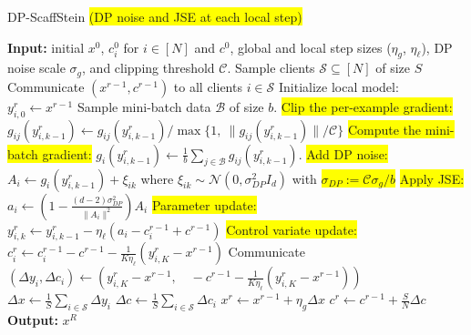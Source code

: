 \begin{algorithm}[H]
\caption{DP-ScaffStein \colorbox{yellow}{(DP noise and JSE at {\color{red}each} local step)}}
\label{algo:scaffstein_2}
\begin{algorithmic}[1]
\State \textbf{Input:} initial $x^0$, $c_i^0$ for $i \in [N]$ and $c^0$, global and local step sizes ($\eta_g$, $\eta_\ell$), DP noise scale $\sigma_g$, and clipping threshold $\mathcal{C}$.
\State Sample clients $\mathcal{S} \subseteq [N]$ of size $S$
\State Communicate $(x^{r-1}, c^{r-1})$ to all clients $i \in \mathcal{S}$
\State Initialize local model: $y_{i,0}^{r} \gets x^{r-1}$
\State Sample mini-batch data $\mathcal{B}$ of size $b$.
\State \colorbox{yellow}{Clip the per-example gradient:}
\State $g_{ij}(y^r_{i,k-1}) \gets g_{ij}(y^r_{i,k-1}) / \max \{1, \ \|g_{ij}(y^r_{i,k-1})\|/\mathcal{C}\} $
\EndFor
\State \colorbox{yellow}{Compute the mini-batch gradient:}
$g_{i}(y_{i,k-1}^{r}) \gets \frac{1}{b} \sum_{j \in \mathcal{B}} g_{ij}(y_{i,k-1}^{r})$. 
\State \colorbox{yellow}{Add DP noise:}  $A_i \gets g_i(y_{i,k-1}^{r}) +  \xi_{ik}$ where $\xi_{ik} \sim \mathcal{N}(0,  \sigma_{DP}^2 I_d)$ with \colorbox{yellow}{$\sigma_{DP}:= \mathcal{C} \sigma_g/b$}
\State \colorbox{yellow}{Apply JSE:} $a_i \gets \left( 1 - \frac{(d-2)\sigma_{DP}^2}{\|A_i\|^2} \right) A_i$
\State \colorbox{yellow}{Parameter update:} $y_{i,k}^{r} \gets y_{i,k-1}^{r} - \eta_\ell (a_i - c_i^{r-1} + c^{r-1})$
\EndFor
\State \colorbox{yellow}{Control variate update:}  $c_i^r \gets c_i^{r-1} - c^{r-1} - \frac{1}{K \eta_\ell} ( y_{i,K}^r - x^{r-1} )$
\State Communicate $(\Delta y_i,\Delta c_i) \gets \left(y_{i,K}^r - x^{r-1}, \quad - c^{r-1} - \frac{1}{K \eta_\ell} ( y_{i,K}^r - x^{r-1} ) \right)$ 
\EndFor
\State $\Delta x  \gets \frac{1}{S} \sum_{i \in \mathcal{S}} \Delta y_i$
\State $\Delta c \gets \frac{1}{S} \sum_{i \in \mathcal{S}} \Delta c_i$
\State $x^r \gets x^{r-1} + \eta_g \Delta x$
\State $c^r \gets c^{r-1} +\frac{S}{N}\Delta c$
\EndFor
\State \textbf{Output:} $x^R$
\end{algorithmic}
\end{algorithm}

